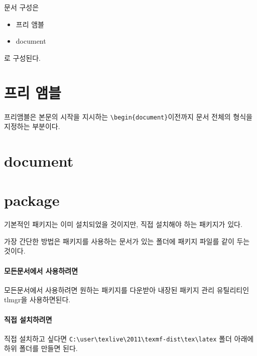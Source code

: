 \documentclass[12pt, a4paper, oneside]{book}
\let\stdsection\section
\renewcommand\section{\newpage\stdsection}
\begin{document}
			 문서 구성은 
			\begin{itemize}
			\item 프리 앰블
			\item document
			\end{itemize}
			 로 구성된다.
	
	\newpage
	\section{프리 앰블}
	\null
	
			프리앰블은 본문의 시작을 지시하는 \verb|\begin{document}|이전까지 
			문서 전체의 형식을 지정하는 부분이다.
		
	\newpage
	\section{document}
	\null
	
	
	
	\newpage
	\section{package}
	\null
	
			기본적인 패키지는 이미 설치되었을 것이지만, 직접 설치해야 하는 패키지가 있다. 
		
			가장 간단한 방법은 패키지를 사용하는 문서가 있는 폴더에 패키지 파일를 같이 두는 것이다.
		
			\paragraph{모든문서에서 사용하려면}
			모든문서에서 사용하려면 
			원하는 패키지를 다운받아 내장된 패키지 관리 유틸리티인 tlmgr을 사용하면된다.
		
			\paragraph{직접 설치하려면}
			직접 설치하고 싶다면 
			\verb|C:\user\texlive\2011\texmf-dist\tex\latex| 폴더 아래에하위 폴더를 만들면 된다.




	 {\protect\newpage}
\end{document}
